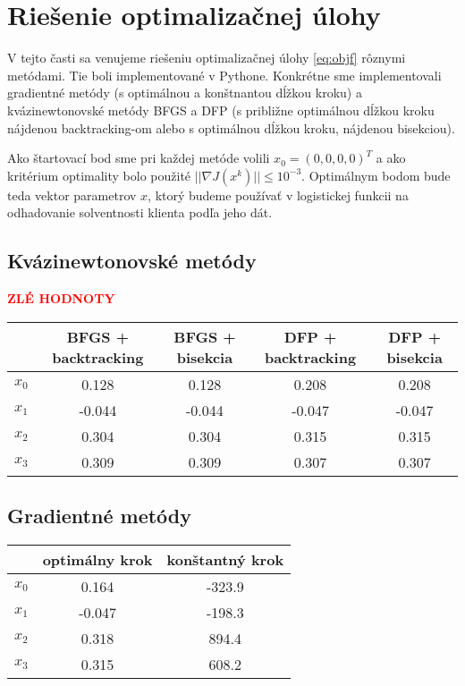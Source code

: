 \documentclass[report.tex]{subfiles}
\begin{document}
   

\section{Riešenie optimalizačnej úlohy}\label{sec:CD}

V tejto časti sa venujeme riešeniu optimalizačnej úlohy \ref{eq:objf} rôznymi metódami. Tie boli implementované v Pythone. Konkrétne sme implementovali gradientné metódy (s optimálnou a konštnantou dĺžkou kroku) a kvázinewtonovské metódy BFGS a DFP (s približne optimálnou dĺžkou kroku nájdenou backtracking-om alebo s optimálnou dĺžkou kroku, nájdenou bisekciou). 

Ako štartovací bod sme pri každej metóde volili $x_0 = (0,0,0,0)^T$ a ako kritérium optimality bolo použité $||\nabla J(x^k)|| \leq 10^{-3}$. Optimálnym bodom bude teda vektor parametrov $x$, ktorý budeme používať v logistickej funkcii na odhadovanie solventnosti klienta podľa jeho dát.
	
\subsection{Kvázinewtonovské metódy}



\textcolor{red}{\textbf{\Large{ZLÉ  HODNOTY}}}
\begin{center}
	\small
	\begin{tabular}{| c | c  c  c  c |}
		\hline
		 & BFGS + backtracking & BFGS + bisekcia & DFP + backtracking & DFP + bisekcia \\
		\hline
		$x_0$ & 0.128 & 0.128 & 0.208 & 0.208 \\
		$x_1$ & -0.044 & -0.044 & -0.047 & -0.047 \\
		$x_2$ & 0.304 &  0.304 & 0.315 & 0.315 \\
		$x_3$ & 0.309 & 0.309 & 0.307 & 0.307 \\
		\hline
	\end{tabular}
\end{center}

\subsection{Gradientné metódy}

\begin{center}
	\small
	\begin{tabular}{| c | c  c |}
		\hline
		& optimálny krok & konštantný krok \\
		\hline
		$x_0$ & 0.164 & -323.9  \\
		$x_1$ & -0.047 & -198.3  \\
		$x_2$ & 0.318 &  894.4  \\
		$x_3$ & 0.315 & 608.2  \\
		\hline
	\end{tabular}
\end{center}
\end{document}
